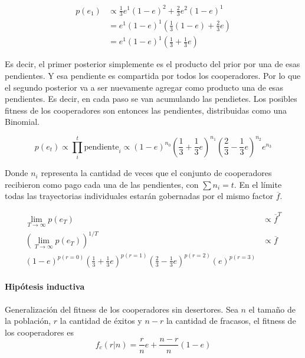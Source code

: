 \documentclass[a4paper,10pt]{article}
\begin{document}
\begin{equation}
\begin{split}
p(e_1) & \propto \frac{1}{3} e^1 (1-e)^2 + \frac{2}{3} e^2 (1-e)^1  \\
& =  e^1 (1-e)^1 ( \frac{1}{3} (1-e) +  \frac{2}{3} e)  \\
& =  e^1 (1-e)^1 (\frac{1}{3} + \frac{1}{3}e )
\end{split}
\end{equation}

Es decir, el primer posterior simplemente es el producto del prior por una de esas pendientes.
Y esa pendiente es compartida por todos los cooperadores.
Por lo que el segundo posterior va a ser nuevamente agregar como producto una de esas pendientes.
Es decir, en cada paso se van acumulando las pendietes.
Los posibles fitness de los cooperadores son entonces las pendientes, distribuidas como una Binomial. 


\begin{equation}
p(e_t) \propto \prod_i^t \text{pendiente}_i \propto (1-e)^{n_0} (\frac{1}{3} + \frac{1}{3}e )^{n_1} (\frac{2}{3} - \frac{1}{3}e )^{n_2} e^{n_3}
\end{equation}

Donde $n_i$ representa la cantidad de veces que el conjunto de cooperadores recibieron como pago cada una de las pendientes, con $\sum n_i = t$.
En el límite todas las trayectorias individuales estarán gobernadas por el mismo factor $\overline{f}$.

\begin{equation}
\begin{split}
\lim_{T \rightarrow \infty} p(e_T) & \propto \overline{f}^T \\
(\lim_{T \rightarrow \infty} p(e_T) )^{1/T} & \propto \overline{f} \\
(1-e)^{p(r=0)} (\frac{1}{3} + \frac{1}{3}e )^{p(r=1)} (\frac{2}{3} - \frac{1}{3}e )^{p(r=2)} (e)^{p(r=3)} & 
\end{split}
\end{equation}


\vspace{0.3cm}

\paragraph{Hipótesis inductiva} Generalización del fitness de los cooperadores sin desertores.
Sea $n$ el tamaño de la población, $r$ la cantidad de éxitos y $n-r$ la cantidad de fracasos, el fitness de los cooperadores es
\begin{equation}
f_c(r|n) = \frac{r}{n} e + \frac{n-r}{n}(1-e)
\end{equation}
\end{document}
